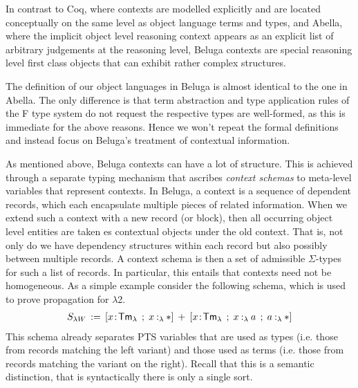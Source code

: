 \documentclass[a4paper,UKenglish]{lipics-v2016}
\newcommand{\ms}{\,}
\newcommand{\mrel}[1]{\mathrel{\ms #1 \ms}}
\newcommand{\eqdef}{\mrel{:=}}
\newcommand{\SysL}{$\lambda$2\xspace}
\newcommand{\TmL}{\ensuremath{\mathsf{Tm_{\lambda}}}}
\newcommand{\of}{\ensuremath{\!:\!}}
\newcommand{\typingLh}[2]{\ensuremath{#1 \mathbin{:_{\lambda}} #2}}
\newcommand{\Prp}{\ensuremath{\textrm{\textasteriskcentered}}}
\begin{document}
In contrast to Coq, where contexts are modelled explicitly and are located conceptually on the same level as object language terms and types, and Abella, where the implicit object level reasoning context appears as an explicit list of arbitrary judgements at the reasoning level, Beluga contexts are special reasoning level first class objects that can exhibit rather complex structures.

The definition of our object languages in Beluga is almost identical to the one in Abella.
The only difference is that term abstraction and type application rules of the F type system do not request the respective types are well-formed, as this is immediate for the above reasons.
Hence we won't repeat the formal definitions and instead focus on Beluga's treatment of contextual information.

As mentioned above, Beluga contexts can have a lot of structure.
This is achieved through a separate typing mechanism that ascribes \emph{context schemas} to meta-level variables that represent contexts.
In Beluga, a context is a sequence of dependent records, which each encapsulate multiple pieces of related information.
When we extend such a context with a new record (or block), then all occurring object level entities are taken es contextual objects under the old context.
That is, not only do we have dependency structures within each record but also possibly between multiple records.
A context schema is then a set of admissible $\Sigma$-types for such a list of records.
In particular, this entails that contexts need not be homogeneous.
As a simple example consider the following schema, which is used to prove propagation for \SysL.
\begin{align*}
  S_{\lambda W} \eqdef [x\of\TmL \mrel{;} \typingLh{x}{\Prp}] \mrel{+} [x\of\TmL \mrel{;} \typingLh{x}{a} \mrel{;} \typingLh{a}{\Prp}]
\end{align*}
This schema already separates PTS variables that are used as types (i.e. those from records matching the left variant) and those used as terms (i.e. those from records matching the variant on the right).
Recall that this is a semantic distinction, that is syntactically there is only a single sort.
\end{document}
